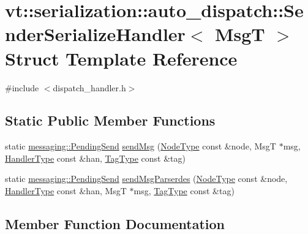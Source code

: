 \hypertarget{structvt_1_1serialization_1_1auto__dispatch_1_1_sender_serialize_handler}{}\section{vt\+:\+:serialization\+:\+:auto\+\_\+dispatch\+:\+:Sender\+Serialize\+Handler$<$ MsgT $>$ Struct Template Reference}
\label{structvt_1_1serialization_1_1auto__dispatch_1_1_sender_serialize_handler}


{\ttfamily \#include $<$dispatch\+\_\+handler.\+h$>$}

\subsection*{Static Public Member Functions}
\begin{DoxyCompactItemize}
\item 
static \hyperlink{structvt_1_1messaging_1_1_pending_send}{messaging\+::\+Pending\+Send} \hyperlink{structvt_1_1serialization_1_1auto__dispatch_1_1_sender_serialize_handler_a4cf522b007b8d19c7baff63280b60e26}{send\+Msg} (\hyperlink{namespacevt_a866da9d0efc19c0a1ce79e9e492f47e2}{Node\+Type} const \&node, MsgT $\ast$msg, \hyperlink{namespacevt_af64846b57dfcaf104da3ef6967917573}{Handler\+Type} const \&han, \hyperlink{namespacevt_a84ab281dae04a52a4b243d6bf62d0e52}{Tag\+Type} const \&tag)
\item 
static \hyperlink{structvt_1_1messaging_1_1_pending_send}{messaging\+::\+Pending\+Send} \hyperlink{structvt_1_1serialization_1_1auto__dispatch_1_1_sender_serialize_handler_aa4c133e4b2d5102048a056fa9fe06c64}{send\+Msg\+Parserdes} (\hyperlink{namespacevt_a866da9d0efc19c0a1ce79e9e492f47e2}{Node\+Type} const \&node, \hyperlink{namespacevt_af64846b57dfcaf104da3ef6967917573}{Handler\+Type} const \&han, MsgT $\ast$msg, \hyperlink{namespacevt_a84ab281dae04a52a4b243d6bf62d0e52}{Tag\+Type} const \&tag)
\end{DoxyCompactItemize}


\subsection{Member Function Documentation}
\mbox{\label{structvt_1_1serialization_1_1auto__dispatch_1_1_sender_serialize_handler_a4cf522b007b8d19c7baff63280b60e26}} 
